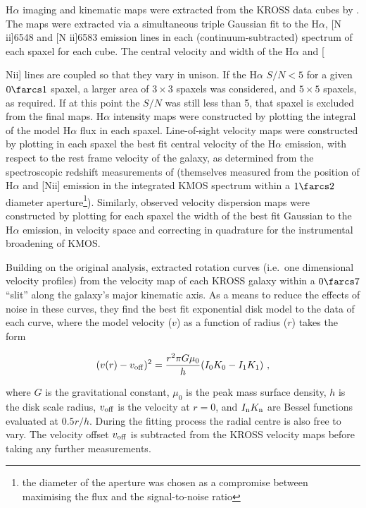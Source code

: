 \documentclass[a4paper,fleqn,usenatbib]{mnras}
\begin{document}
H$\alpha$ imaging and kinematic maps were extracted from the KROSS data cubes by \citet{Stott:2016}. The maps were extracted via a simultaneous triple Gaussian fit to the H$\alpha$, [N {\sc ii}]6548 and [N {\sc ii}]6583 emission lines in each (continuum-subtracted) spectrum of each spaxel for each cube. The central velocity and width of the H$\alpha$ and [{N{\sc ii}] lines are coupled so that they vary in unison. If the H$\alpha$ $S/N < 5$ for a given $0\farcs1$ spaxel, a larger area of  $3 \times 3$ spaxels was considered, and $5 \times 5$ spaxels, as required. If at this point the $S/N$ was still less than 5, that spaxel is excluded from the final maps. H$\alpha$ intensity maps were constructed by plotting the integral of the model H$\alpha$ flux in each spaxel. Line-of-sight velocity maps were constructed by plotting in each spaxel the  best fit central velocity of the H$\alpha$ emission, with respect to the rest frame velocity of the galaxy, as determined from the spectroscopic redshift measurements of \citet{Harrison:2017} (themselves measured from the position of H$\alpha$ and [N{\sc ii}] emission in the integrated KMOS spectrum within a $1\farcs2$ diameter aperture\footnote{the diameter of the aperture was chosen as a compromise between maximising the flux and the signal-to-noise ratio}). Similarly, observed velocity dispersion maps were constructed by plotting for each spaxel the width of the best fit Gaussian to the H$\alpha$ emission, in velocity space and correcting in quadrature for the instrumental broadening of KMOS. 

Building on the original analysis, \citet{Harrison:2017} extracted rotation curves (i.e.\ one dimensional velocity profiles) from the velocity map of each KROSS galaxy within a $0\farcs7$ ``slit'' along the galaxy's major kinematic axis. As a means to reduce the effects of noise in these curves, they find the best fit exponential disk model to the data of each curve, where the model velocity ($v$) as a function of radius ($r$) takes the form

\begin{equation} \label{eq:mod} 
(v(r)-v_{\rm{off}})^{2}=\frac{r^2 \pi G \mu_{0}}{h}(I_{0}K_{0}-I_{1}K_{1}) \,\,,
\end{equation}


\noindent where $G$ is the gravitational constant, $\mu_{0}$ is the peak mass surface density, $h$ is the disk scale radius, $v_{\rm{off}}$ is the velocity at $r=0$, and $I_{\rm{n}}K_{\rm{n}}$ are Bessel functions evaluated at $0.5r/h$. During the fitting process the radial centre is also free to vary. The velocity offset $v_{\rm{off}}$ is subtracted from the KROSS velocity maps before taking any further measurements. 

}
\end{document}
